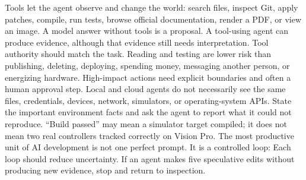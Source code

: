 {}
\markdownRendererSectionEnd \markdownRendererSectionBegin
{}\markdownRendererInterblockSeparator
{}Tools let the agent observe and change the world: search files, inspect Git,\markdownRendererSoftLineBreak
{}apply patches, compile, run tests, browse official documentation, render a PDF,\markdownRendererSoftLineBreak
{}or view an image. A model answer without tools is a proposal. A tool-using\markdownRendererSoftLineBreak
{}agent can produce evidence, although that evidence still needs interpretation.\markdownRendererParagraphSeparator
{}Tool authority should match the task. Reading and testing are lower risk than\markdownRendererSoftLineBreak
{}publishing, deleting, deploying, spending money, messaging another person, or\markdownRendererSoftLineBreak
{}energizing hardware. High-impact actions need explicit boundaries and often a\markdownRendererSoftLineBreak
{}human approval step.\markdownRendererInterblockSeparator
{}
\markdownRendererSectionEnd \markdownRendererSectionBegin
{}\markdownRendererInterblockSeparator
{}Local and cloud agents do not necessarily see the same files, credentials,\markdownRendererSoftLineBreak
{}devices, network, simulators, or operating-system APIs. State the important\markdownRendererSoftLineBreak
{}environment facts and ask the agent to report what it could not reproduce.\markdownRendererSoftLineBreak
{}“Build passed” may mean a simulator target compiled; it does not mean two real\markdownRendererSoftLineBreak
{}controllers tracked correctly on Vision Pro.\markdownRendererInterblockSeparator
{}
\markdownRendererSectionEnd \markdownRendererSectionBegin
{}\markdownRendererInterblockSeparator
{}The most productive unit of AI development is not one perfect prompt. It is a\markdownRendererSoftLineBreak
{}controlled loop:\markdownRendererInterblockSeparator
{}\markdownRendererInterblockSeparator
{}Each loop should reduce uncertainty. If an agent makes five speculative edits\markdownRendererSoftLineBreak
{}without producing new evidence, stop and return to inspection.\markdownRendererInterblockSeparator
{}\markdownRendererThematicBreak{}\markdownRendererInterblockSeparator
{}
\markdownRendererSectionEnd 
\markdownRendererSectionEnd \markdownRendererSectionBegin
{}\markdownRendererInterblockSeparator
